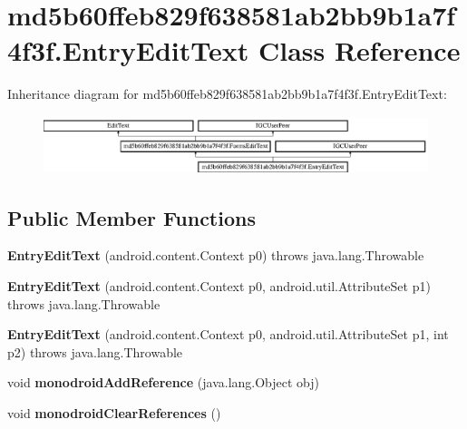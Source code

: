 \hypertarget{classmd5b60ffeb829f638581ab2bb9b1a7f4f3f_1_1EntryEditText}{}\section{md5b60ffeb829f638581ab2bb9b1a7f4f3f.\+Entry\+Edit\+Text Class Reference}
\label{classmd5b60ffeb829f638581ab2bb9b1a7f4f3f_1_1EntryEditText}
Inheritance diagram for md5b60ffeb829f638581ab2bb9b1a7f4f3f.\+Entry\+Edit\+Text\+:\begin{figure}[H]
\begin{center}
\leavevmode
\includegraphics[height=1.686747cm]{classmd5b60ffeb829f638581ab2bb9b1a7f4f3f_1_1EntryEditText}
\end{center}
\end{figure}
\subsection*{Public Member Functions}
\begin{DoxyCompactItemize}
\item 
\mbox{\label{classmd5b60ffeb829f638581ab2bb9b1a7f4f3f_1_1EntryEditText_a43fa3f79c97f30676559ff6ab8a5773d}} 
{\bfseries Entry\+Edit\+Text} (android.\+content.\+Context p0)  throws java.\+lang.\+Throwable 	
\item 
\mbox{\label{classmd5b60ffeb829f638581ab2bb9b1a7f4f3f_1_1EntryEditText_a2ed76d0883a4b11b021ecdb18a945f8f}} 
{\bfseries Entry\+Edit\+Text} (android.\+content.\+Context p0, android.\+util.\+Attribute\+Set p1)  throws java.\+lang.\+Throwable 	
\item 
\mbox{\label{classmd5b60ffeb829f638581ab2bb9b1a7f4f3f_1_1EntryEditText_a0a1ed18804c51763e823cb1b17d9a256}} 
{\bfseries Entry\+Edit\+Text} (android.\+content.\+Context p0, android.\+util.\+Attribute\+Set p1, int p2)  throws java.\+lang.\+Throwable 	
\item 
\mbox{\label{classmd5b60ffeb829f638581ab2bb9b1a7f4f3f_1_1EntryEditText_a7472d6c3ce83f5d2334598037d779849}} 
void {\bfseries monodroid\+Add\+Reference} (java.\+lang.\+Object obj)
\item 
\mbox{\label{classmd5b60ffeb829f638581ab2bb9b1a7f4f3f_1_1EntryEditText_a788af3e6d9362437aec111b13b19f2c3}} 
void {\bfseries monodroid\+Clear\+References} ()
\end{DoxyCompactItemize}
